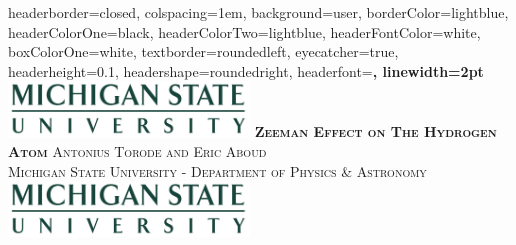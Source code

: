 \documentclass[landscape,a0paper,fontscale=0.285]{baposter} %
\begin{document}
\begin{poster}
{
headerborder=closed, %
colspacing=1em, %
background=user,
borderColor=lightblue, %
headerColorOne=black, %
headerColorTwo=lightblue, %
headerFontColor=white, %
boxColorOne=white, %
textborder=roundedleft, %
eyecatcher=true, %
headerheight=0.1\textheight, %
headershape=roundedright, %
headerfont=\Large\bf\textsc, %
linewidth=2pt %
}
%
{\includegraphics[height=4em]{MSU.jpg}} %
{\bf\textsc{Zeeman Effect on The Hydrogen Atom}\vspace{0.5em}} %
{\textsc{Antonius Torode and Eric Aboud \\ Michigan State University - Department of Physics \& Astronomy}} %
{\includegraphics[height=4em]{MSU.jpg}} %



\end{poster}
\end{document}
